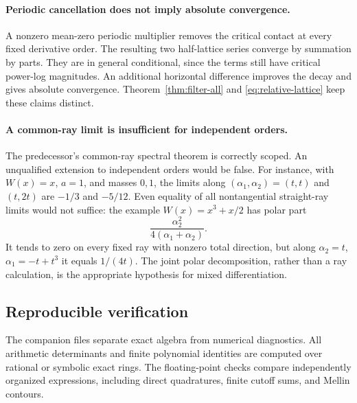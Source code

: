 \documentclass[11pt,letterpaper]{article}
\numberwithin{equation}{section}
\theoremstyle{definition}
\theoremstyle{remark}
\begin{document}
\paragraph{Periodic cancellation does not imply absolute convergence.}
A nonzero mean-zero periodic multiplier removes the critical
contact at every fixed derivative order. The resulting two
half-lattice series converge by summation by parts. They are in
general conditional, since the terms still have critical
power-log magnitudes. An additional horizontal difference
improves the decay and gives absolute convergence.
Theorem~\ref{thm:filter-all} and
\eqref{eq:relative-lattice} keep these claims distinct.

\paragraph{A common-ray limit is insufficient for independent orders.}
The predecessor's common-ray spectral theorem is correctly
scoped. An unqualified extension to independent orders would
be false. For instance, with \(W(x)=x\), \(a=1\), and masses
\(0,1\), the limits along \((\alpha_1,\alpha_2)=(t,t)\) and
\((t,2t)\) are \(-1/3\) and \(-5/12\).
Even equality of all nontangential straight-ray limits would
not suffice: the example \(W(x)=x^3+x/2\) has polar part
\[
 \frac{\alpha_2^2}{4(\alpha_1+\alpha_2)}.
\]
It tends to zero on every fixed ray with nonzero total direction,
but along \(\alpha_2=t\),
\(\alpha_1=-t+t^3\) it equals \(1/(4t)\).
The joint polar decomposition, rather than a ray calculation,
is the appropriate hypothesis for mixed differentiation.

\subsection{Reproducible verification}

The companion files separate exact algebra from numerical
diagnostics. All arithmetic determinants and finite polynomial
identities are computed over rational or symbolic exact rings.
The floating-point checks compare independently organized
expressions, including direct quadratures, finite cutoff sums,
and Mellin contours.
\end{document}
